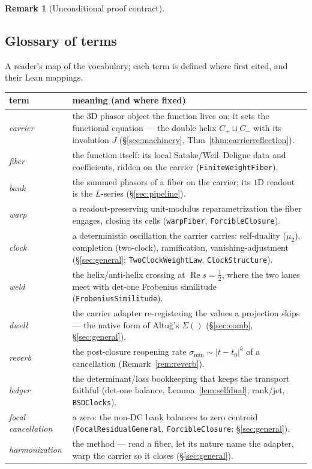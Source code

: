 \documentclass[11pt]{article}
\theoremstyle{definition}
\newtheorem{remark}[theorem]{Remark}
\renewcommand{\Re}{\operatorname{Re}}
\begin{document}
\begin{remark}[Unconditional proof contract]
\begin{enumerate}
\section*{Glossary of terms}
\noindent A reader's map of the vocabulary; each term is defined where first cited, and their Lean mappings.

\begin{center}
\small
\begin{tabular}{@{}lp{}@{}}
\toprule
term & meaning (and where fixed) \\
\midrule
\emph{carrier} & the $3$D phasor object the function lives on; it sets the functional equation --- the double
helix $C_+\sqcup C_-$ with its involution $J$ (\S\ref{sec:machinery}, Thm~\ref{thm:carrierreflection}). \\
\emph{fiber} & the function itself: its local Satake/Weil--Deligne data and coefficients, ridden on the carrier
(\texttt{FiniteWeightFiber}). \\
\emph{bank} & the summed phasors of a fiber on the carrier; its $1$D readout is the $L$-series
(\S\ref{sec:pipeline}). \\
\emph{warp} & a readout-preserving unit-modulus reparametrization the fiber engages, closing its cells
(\texttt{warpFiber}, \texttt{ForcibleClosure}). \\
\emph{clock} & a deterministic oscillation the carrier carries: self-duality ($\mu_2$), completion (two-clock),
ramification, vanishing-adjustment (\S\ref{sec:general}; \texttt{TwoClockWeightLaw}, \texttt{ClockStructure}). \\
\emph{weld} & the helix/anti-helix crossing at $\Re s=\tfrac12$, where the two lanes meet with det-one Frobenius
similitude (\texttt{FrobeniusSimilitude}). \\
\emph{dwell} & the carrier adapter re-registering the values a projection skips --- the native form of
Altu\u{g}'s $\Sigma()$ (\S\ref{sec:comb},\,\S\ref{sec:general}). \\
\emph{reverb} & the post-closure reopening rate $\sigma_{\min}\sim|t-t_0|^{k}$ of a cancellation
(Remark~\ref{rem:reverb}). \\
\emph{ledger} & the determinant/loss bookkeeping that keeps the transport faithful (det-one balance,
Lemma~\ref{lem:selfdual}; rank/jet, \texttt{BSDClocks}). \\
\emph{focal cancellation} & a zero: the non-DC bank balances to zero centroid (\texttt{FocalResidualGeneral},
\texttt{ForcibleClosure}; \S\ref{sec:general}). \\
\emph{harmonization} & the method --- read a fiber, let its nature name the adapter, warp the carrier so it
closes (\S\ref{sec:general}). \\
\bottomrule
\end{tabular}
\end{center}


\end{enumerate}
\end{remark}
\end{document}
